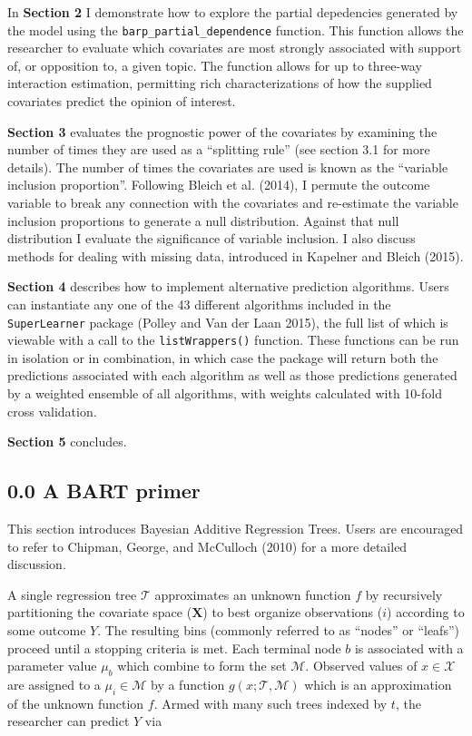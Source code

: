\documentclass[]{article}
\begin{document}
In \textbf{Section 2} I demonstrate how to explore the partial
depedencies generated by the model using the
\texttt{barp\_partial\_dependence} function. This function allows the
researcher to evaluate which covariates are most strongly associated
with support of, or opposition to, a given topic. The function allows
for up to three-way interaction estimation, permitting rich
characterizations of how the supplied covariates predict the opinion of
interest.

\textbf{Section 3} evaluates the prognostic power of the covariates by
examining the number of times they are used as a ``splitting rule'' (see
section 3.1 for more details). The number of times the covariates are
used is known as the ``variable inclusion proportion''. Following Bleich
et al. (2014), I permute the outcome variable to break any connection
with the covariates and re-estimate the variable inclusion proportions
to generate a null distribution. Against that null distribution I
evaluate the significance of variable inclusion. I also discuss methods
for dealing with missing data, introduced in Kapelner and Bleich (2015).

\textbf{Section 4} describes how to implement alternative prediction
algorithms. Users can instantiate any one of the 43 different algorithms
included in the \texttt{SuperLearner} package (Polley and Van der Laan
2015), the full list of which is viewable with a call to the
\texttt{listWrappers()} function. These functions can be run in
isolation or in combination, in which case the package will return both
the predictions associated with each algorithm as well as those
predictions generated by a weighted ensemble of all algorithms, with
weights calculated with 10-fold cross validation.

\textbf{Section 5} concludes.

\subsection{0.0 A BART primer}\label{a-bart-primer}

This section introduces Bayesian Additive Regression Trees. Users are
encouraged to refer to Chipman, George, and McCulloch (2010) for a more
detailed discussion.

A single regression tree \(\mathcal{T}\) approximates an unknown
function \(f\) by recursively partitioning the covariate space
(\(\mathbf{X}\)) to best organize observations (\(i\)) according to some
outcome \(Y\). The resulting bins (commonly referred to as ``nodes'' or
``leafs'') proceed until a stopping criteria is met. Each terminal node
\(b\) is associated with a parameter value \(\mu_b\) which combine to
form the set \(\mathcal{M}\). Observed values of \(x \in \mathcal{X}\)
are assigned to a \(\mu_i \in \mathcal{M}\) by a function
\(g(x; \mathcal{T},\mathcal{M})\) which is an approximation of the
unknown function \(f\). Armed with many such trees indexed by \(t\), the
researcher can predict \(Y\) via
\end{document}
